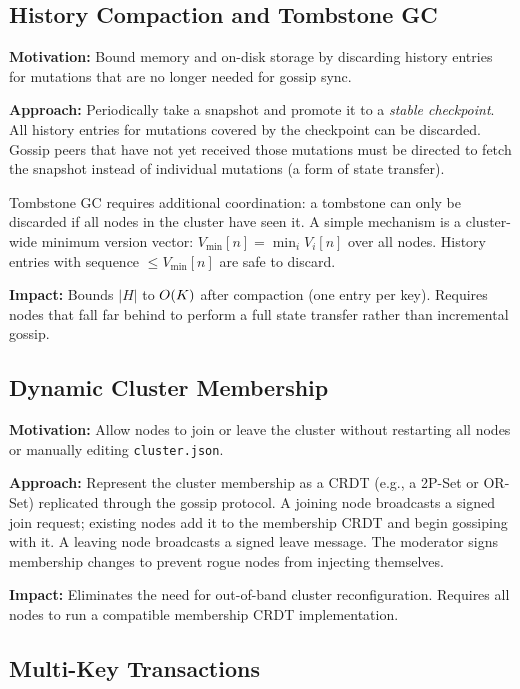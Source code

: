 \subsection{History Compaction and Tombstone GC}

\textbf{Motivation:} Bound memory and on-disk storage by discarding history
entries for mutations that are no longer needed for gossip sync.

\textbf{Approach:} Periodically take a snapshot and promote it to a
\emph{stable checkpoint}. All history entries for mutations covered by the
checkpoint can be discarded. Gossip peers that have not yet received those
mutations must be directed to fetch the snapshot instead of individual mutations
(a form of state transfer).

Tombstone GC requires additional coordination: a tombstone can only be discarded
if all nodes in the cluster have seen it. A simple mechanism is a cluster-wide
minimum version vector: $V_{\min}[n] = \min_{i} V_i[n]$ over all nodes. History
entries with sequence $\leq V_{\min}[n]$ are safe to discard.

\textbf{Impact:} Bounds $|H|$ to $O\!\left(K\right)$ after compaction (one entry per key).
Requires nodes that fall far behind to perform a full state transfer rather than
incremental gossip.

\subsection{Dynamic Cluster Membership}

\textbf{Motivation:} Allow nodes to join or leave the cluster without restarting
all nodes or manually editing \texttt{cluster.json}.

\textbf{Approach:} Represent the cluster membership as a CRDT (e.g., a 2P-Set
or OR-Set) replicated through the gossip protocol. A joining node broadcasts a
signed join request; existing nodes add it to the membership CRDT and begin
gossiping with it. A leaving node broadcasts a signed leave message. The
moderator signs membership changes to prevent rogue nodes from injecting
themselves.

\textbf{Impact:} Eliminates the need for out-of-band cluster reconfiguration.
Requires all nodes to run a compatible membership CRDT implementation.

\subsection{Multi-Key Transactions}

